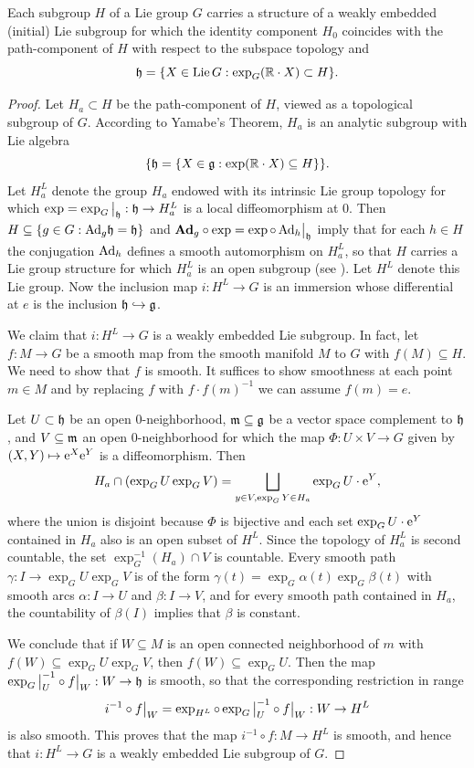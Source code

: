 \begin{thm}\label{thm initial subgroup}
    Each subgroup $H$ of a Lie group $G$ carries a structure of a weakly embedded (initial) Lie subgroup for which the identity component $H_0$ coincides with the path-component of $H$ with respect to the subspace topology and
    \[\mathfrak{h}=\{X\in\operatorname{Lie} G: \exp_G(\mathbb{R}\cdot X)\subset H\}.\]
\end{thm}
\begin{proof}
    Let $H_a\subset H$ be the path-component of $H$, viewed as a topological subgroup of $G$. According to Yamabe's Theorem, $H_a$ is an analytic subgroup with Lie algebra
    \[\{\mathfrak{h}=\{X\in\mathfrak{g}:\exp(\mathbb{R}\cdot X)\subseteq H\}\}.\]
    Let $H_a^L$ denote the group $H_a$ endowed with its intrinsic Lie group topology for which $\exp=\restr{\exp_G}{\frakh}:\frakh\to H_a^L$ is a local diffeomorphism at $0$. Then $H\subseteq\{g\in G:\mathrm{Ad}_g\mathfrak{h}=\mathfrak{h}\}$ and $\Adg_g\circ \exp=\exp\circ\restr{\Ad_h}{\frakh}$ imply that for each $h\in H$ the conjugation $\mathrm{Ad}_h$ defines a smooth automorphism on $H_a^L$, so that $H$ carries a Lie group structure for which $H_a^L$ is an open subgroup (see \cite[Thm.~9.4.4, Cor.~9.4.5]{HN}). Let $H^L$ denote this Lie group. Now the inclusion map $i:H^L\to G$ is an immersion whose differential at $e$ is the inclusion $\mathfrak{h}\hookrightarrow\mathfrak{g}$.

    We claim that $i:H^L\to G$ is a weakly embedded Lie subgroup. In fact, let $f:M\to G$ be a smooth map from the smooth manifold $M$ to $G$ with $f(M)\subseteq H$. We need to show that $f$ is smooth. It suffices to show smoothness at each point $m\in M$ and by replacing $f$ with $f\cdot f(m)^{-1}$ we can assume $f(m)=e$.

    Let $U\subset \mathfrak{h}$ be an open 0-neighborhood, $\mathfrak{m}\subseteq\mathfrak{g}$ be a vector space complement to $\mathfrak{h}$, and $V\subseteq \mathfrak{m}$ an open 0-neighborhood for which the map $\Phi:U\times V\to G$ given by $(X,Y)\mapsto \mathrm{e}^X\mathrm{e}^Y$ is a diffeomorphism. Then 
    \[H_a\cap(\exp_G U\exp_G V)=\bigsqcup_{y\in V,\exp_G Y\in H_a}\exp_GU \cdot \mathrm{e}^Y,\]
    where the union is disjoint because $\Phi$ is bijective and each set $\exp_GU\cdot \mathrm{e}^Y$ contained in $H_a$ also is an open subset of $H^L$. Since the topology of $H^L_a$ is second countable, the set $\exp^{-1}_G(H_a)\cap V$ is countable. Every smooth path $\gamma:I\to \exp_GU\exp_GV$ is of the form $\gamma(t)=\exp_G\alpha(t)\exp_G\beta(t)$ with smooth arcs $\alpha:I\to U$ and $\beta:I\to V$, and for every smooth path contained in $H_a$, the countability of $\beta(I)$ implies that $\beta$ is constant.

    We conclude that if $W\subseteq M$ is an open connected neighborhood of $m$ with $f(W)\subseteq \exp_GU\exp_GV$, then $f(W)\subseteq \exp_GU$. Then the map $\restr{\exp_G}{U}^{-1}\circ \restr{f}{W}:W\to\frakh$ is smooth, so that the corresponding restriction in range
    \[i^{-1}\circ \restr{f}{W}=\exp_{H^L}\circ \restr{\exp_G}{U}^{-1}\circ \restr{f}{W}:W\to H^L\]
    is also smooth. This proves that the map $i^{-1}\circ f:M\to H^L$ is smooth, and hence that $i:H^L\to G$ is a weakly embedded Lie subgroup of $G$.
\end{proof}


